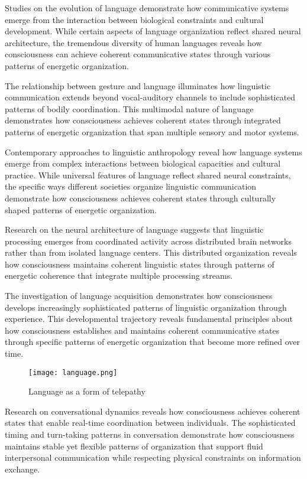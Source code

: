 \begin{refsection}
Studies on the evolution of language \cite{Deacon1997} demonstrate how communicative systems emerge from the interaction between biological constraints and cultural development. While certain aspects of language organization reflect shared neural architecture, the tremendous diversity of human languages reveals how consciousness can achieve coherent communicative states through various patterns of energetic organization.

The relationship between gesture and language \cite{GoldinMeadow2003} illuminates how linguistic communication extends beyond vocal-auditory channels to include sophisticated patterns of bodily coordination. This multimodal nature of language demonstrates how consciousness achieves coherent states through integrated patterns of energetic organization that span multiple sensory and motor systems.

Contemporary approaches to linguistic anthropology \cite{Duranti2009} reveal how language systems emerge from complex interactions between biological capacities and cultural practice. While universal features of language reflect shared neural constraints, the specific ways different societies organize linguistic communication demonstrate how consciousness achieves coherent states through culturally shaped patterns of energetic organization.

Research on the neural architecture of language \cite{Pulvermuller2002} suggests that linguistic processing emerges from coordinated activity across distributed brain networks rather than from isolated language centers. This distributed organization reveals how consciousness maintains coherent linguistic states through patterns of energetic coherence that integrate multiple processing streams.

The investigation of language acquisition \cite{Tomasello2008} demonstrates how consciousness develops increasingly sophisticated patterns of linguistic organization through experience. This developmental trajectory reveals fundamental principles about how consciousness establishes and maintains coherent communicative states through specific patterns of energetic organization that become more refined over time.

\begin{figure}[h]
    \centering
    \texttt{[image: language.png]}

    \caption{Language as a form of telepathy}
\end{figure}

Research on conversational dynamics \cite{Enfield2017} reveals how consciousness achieves coherent states that enable real-time coordination between individuals. The sophisticated timing and turn-taking patterns in conversation demonstrate how consciousness maintains stable yet flexible patterns of organization that support fluid interpersonal communication while respecting physical constraints on information exchange.


\end{refsection}
